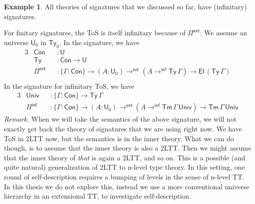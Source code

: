 \documentclass[12pt,a4paper,twoside,openany]{book}
\theoremstyle{remark}
\theoremstyle{definition}
\newtheorem{myexample}{Example}
\theoremstyle{theorem}
\newcommand{\ms}[1]{\mathsf{#1}}
\newcommand{\Ty}{\mathsf{Ty}}
\newcommand{\U}{\mathsf{U}}
\newcommand{\El}{\mathsf{El}}
\newcommand{\Pie}{\Pi^{\mathsf{ext}}}
\newcommand{\toe}{\to^{\ms{ext}}}
\newcommand{\Piinf}{\Pi^{\mathsf{inf}}}
\newcommand{\toinf}{\to^{\ms{inf}}}
\begin{document}
\begin{myexample}
All theories of signatures that we discussed so far, have (infinitary)
signatures.

For finitary signatures, the ToS is itself infinitary because of $\Pie$. We
assume an universe $\U_0$ in $\Ty_0$. In the signature, we have
\begin{alignat*}{3}
  &\ms{Con} &&: \U \\
  &\ms{Ty} &&: \ms{Con} \to \U\\
  &\Pie &&: \{\Gamma : \ms{Con}\} \to (A : \U_0) \toe (A \toinf \ms{Ty}\,\Gamma) \to \El\,(\ms{Ty}\,\Gamma)\\
\end{alignat*}
In the signature for infinitary ToS, we have
\begin{alignat*}{3}
  &\ms{Univ} &&: \{\Gamma : \ms{Con}\} \to \ms{Ty}\,\Gamma\\
  &\Piinf    &&: \{\Gamma : \ms{Con}\} \to (A : \U_0) \toe (A \toinf \ms{Tm}\,\Gamma\,\ms{Univ}) \to \ms{Tm}\,\Gamma\,\ms{Univ}
\end{alignat*}
\emph{Remark.}
When we will take the semantics of the above signature, we will not exactly get
back the theory of signatures that we are using right now. We have ToS in 2LTT
now, but the semantics is in the inner theory. What we can do though, is to
assume that the inner theory is also a 2LTT. Then we might assume that the inner
theory of \emph{that} is again a 2LTT, and so on. This is a possible (and quite
natural) generalization of 2LTT to n-level type theory. In this setting, one
round of self-description requires a bumping of levels in the sense of n-level TT. In
this thesis we do not explore this, instead we use a more conventional universe
hierarchy in an extensional TT, to investigate self-description.
\end{myexample}
\end{document}
